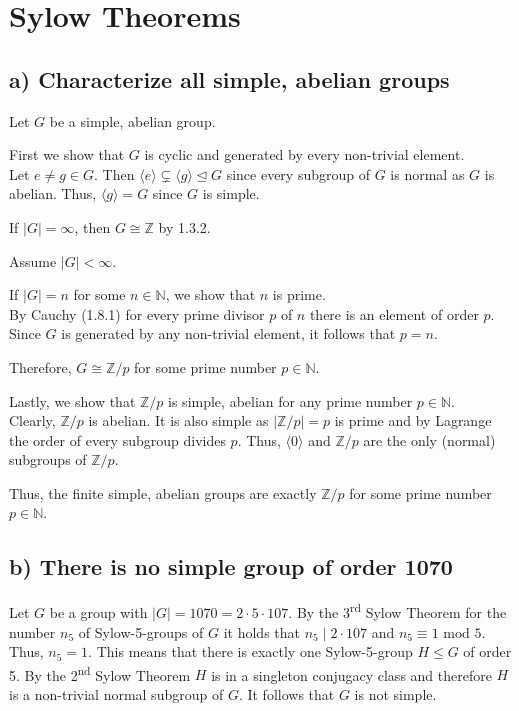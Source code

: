 \section{Sylow Theorems}

\subsection*{a) Characterize all simple, abelian groups}
Let $G$ be a simple, abelian group.

First we show that $G$ is cyclic and generated by every non-trivial element.\\
Let $e \neq g \in G$. Then $\langle e \rangle \subsetneq \langle g \rangle \trianglelefteq G$ since every subgroup of $G$ is normal as $G$ is abelian. Thus, $\langle g \rangle = G$ since $G$ is simple.

If $|G| = \infty$, then $G \cong \mathds{Z}$ by 1.3.2.

Assume $|G| < \infty$.

If $|G| = n$ for some $n \in \mathds{N}$, we show that $n$ is prime.\\
By Cauchy (1.8.1) for every prime divisor $p$ of $n$ there is an element of order $p$. Since $G$ is generated by any non-trivial element, it follows that $p = n$.

Therefore, $G \cong \mathds{Z}/p$ for some prime number $p \in \mathds{N}$.

Lastly, we show that $\mathds{Z}/p$ is simple, abelian for any prime number $p \in \mathds{N}$.\\
Clearly, $\mathds{Z}/p$ is abelian. It is also simple as $|\mathds{Z}/p| = p$ is prime and by Lagrange the order of every subgroup divides $p$. Thus, $\langle 0 \rangle$ and $\mathds{Z}/p$ are the only (normal) subgroups of $\mathds{Z}/p$.

Thus, the finite simple, abelian groups are exactly $\mathds{Z}/p$ for some prime number $p \in \mathds{N}$.

\subsection*{b) There is no simple group of order 1070}
Let $G$ be a group with $|G| = 1070 = 2 \cdot 5 \cdot 107$. By the 3\textsuperscript{rd} Sylow Theorem for the number $n_5$ of Sylow-5-groups of $G$ it holds that $n_5 \mid 2 \cdot 107$ and $n_5 \equiv 1 \text{ mod } 5$. Thus, $n_5 = 1$. This means that there is exactly one Sylow-5-group $H \leq G$ of order 5. By the 2\textsuperscript{nd} Sylow Theorem $H$ is in a singleton conjugacy class and therefore $H$ is a non-trivial normal subgroup of $G$. It follows that $G$ is not simple. 
